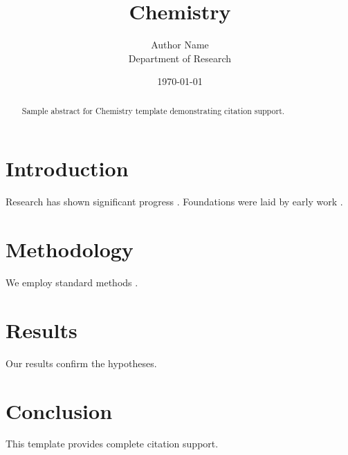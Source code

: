 \documentclass{mdpi}
\title{Chemistry}
\author{Author Name \\ \small Department of Research}
\date{\today}
\begin{document}
\maketitle

\begin{abstract}
Sample abstract for Chemistry template demonstrating citation support.
\end{abstract}

\section{Introduction}
Research has shown significant progress \citep{einstein1905}. Foundations were laid by early work \citep{turing1950}.

\section{Methodology}
We employ standard methods \citep{knuth1984}.

\section{Results}
Our results confirm the hypotheses.

\section{Conclusion}
This template provides complete citation support.



\end{document}
